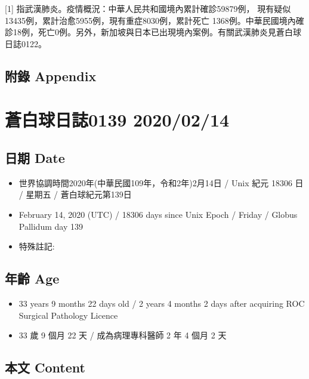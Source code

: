 \documentclass[a5paper, 12pt
]{book}
\providecommand{\tightlist}{%
  \setlength{\itemsep}{0pt}\setlength{\parskip}{0pt}}
\begin{document}
{[}1{]} 指武漢肺炎。疫情概況：中華人民共和國境內累計確診59879例，
現有疑似 13435例，累計治愈5955例，現有重症8030例，累計死亡
1368例。中華民國境內確診18例，死亡0例。另外，新加坡與日本已出現境內案例。有關武漢肺炎見蒼白球日誌0122。

\hypertarget{ux9644ux9304-appendix-74}{%
\subsection{附錄 Appendix}\label{ux9644ux9304-appendix-74}}

\hypertarget{ux84bcux767dux7403ux65e5ux8a8c0139-20200214}{%
\section{蒼白球日誌0139
2020/02/14}\label{ux84bcux767dux7403ux65e5ux8a8c0139-20200214}}

\hypertarget{ux65e5ux671f-date-75}{%
\subsection{日期 Date}\label{ux65e5ux671f-date-75}}

\begin{itemize}
\tightlist
\item
  世界協調時間2020年(中華民國109年，令和2年)2月14日 / Unix 紀元 18306 日
  / 星期五 / 蒼白球紀元第139日
\item
  February 14, 2020 (UTC) / 18306 days since Unix Epoch / Friday /
  Globus Pallidum day 139
\item
  特殊註記:
\end{itemize}

\hypertarget{ux5e74ux9f61-age-75}{%
\subsection{年齡 Age}\label{ux5e74ux9f61-age-75}}

\begin{itemize}
\tightlist
\item
  33 years 9 months 22 days old / 2 years 4 months 2 days after
  acquiring ROC Surgical Pathology Licence
\item
  33 歲 9 個月 22 天 / 成為病理專科醫師 2 年 4 個月 2 天
\end{itemize}

\hypertarget{ux672cux6587-content-75}{%
\subsection{本文 Content}\label{ux672cux6587-content-75}}
\end{document}
